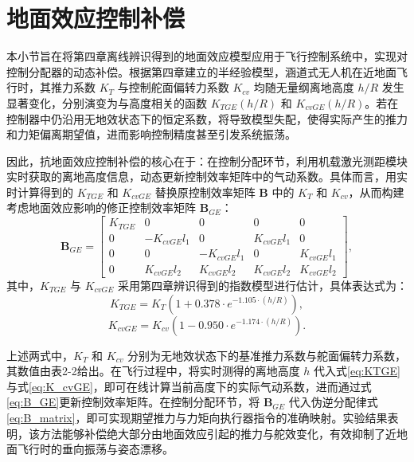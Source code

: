 \section{地面效应控制补偿}
\label{sec:ge_compensate}

本小节旨在将第四章离线辨识得到的地面效应模型应用于飞行控制系统中，实现对控制分配器的动态补偿。根据第四章建立的半经验模型，涵道式无人机在近地面飞行时，其推力系数 \(K_T\) 与控制舵面偏转力系数 \(K_{cv}\) 均随无量纲离地高度 \(h/R\) 发生显著变化，分别演变为与高度相关的函数 \(K_{TGE}(h/R)\) 和 \(K_{cvGE}(h/R)\)。若在控制器中仍沿用无地效状态下的恒定系数，将导致模型失配，使得实际产生的推力和力矩偏离期望值，进而影响控制精度甚至引发系统振荡。

因此，抗地面效应控制补偿的核心在于：在控制分配环节，利用机载激光测距模块实时获取的离地高度信息，动态更新控制效率矩阵中的气动系数。具体而言，用实时计算得到的 \(K_{TGE}\) 和 \(K_{cvGE}\) 替换原控制效率矩阵 \(\boldsymbol{B}\) 中的 \(K_T\) 和 \(K_{cv}\)，从而构建考虑地面效应影响的修正控制效率矩阵 \(\boldsymbol{B}_{GE}\)：
\begin{equation}
    \boldsymbol{B}_{GE} = 
    \begin{bmatrix}
        K_{TGE} & 0 & 0 & 0 & 0 \\
        0 & -K_{cvGE} l_1 & 0 & K_{cvGE} l_1 & 0 \\
        0 & 0 & -K_{cvGE} l_1 & 0 & K_{cvGE} l_1 \\
        0 & K_{cvGE} l_2 & K_{cvGE} l_2 & K_{cvGE} l_2 & K_{cvGE} l_2
    \end{bmatrix},
    \label{eq:B_GE}
\end{equation}
其中，\(K_{TGE}\) 与 \(K_{cvGE}\) 采用第四章辨识得到的指数模型进行估计，具体表达式为：
\begin{equation}
    K_{TGE} = K_{T}\left(1 + 0.378 \cdot e^{-1.105 \cdot (h/R)}\right),
    \label{eq:KTGE}
\end{equation}
\begin{equation}
    K_{cvGE} = K_{cv}\left(1 - 0.950 \cdot e^{-1.174 \cdot (h/R)}\right).
    \label{eq:K_cvGE}
\end{equation}

上述两式中，\(K_T\) 和 \(K_{cv}\) 分别为无地效状态下的基准推力系数与舵面偏转力系数，其数值由表2-2给出。在飞行过程中，将实时测得的离地高度 \(h\) 代入式\eqref{eq:KTGE}与式\eqref{eq:K_cvGE}，即可在线计算当前高度下的实际气动系数，进而通过式\eqref{eq:B_GE}更新控制效率矩阵。在控制分配环节，将 \(\boldsymbol{B}_{GE}\) 代入伪逆分配律式\eqref{eq:B_matrix}，即可实现期望推力与力矩向执行器指令的准确映射。实验结果表明，该方法能够补偿绝大部分由地面效应引起的推力与舵效变化，有效抑制了近地面飞行时的垂向振荡与姿态漂移。

